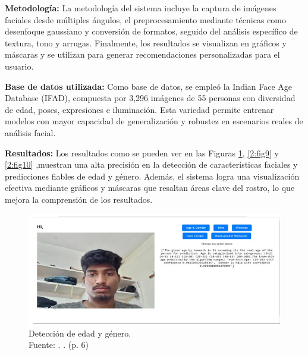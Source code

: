 \textbf{Metodología:}
La metodología del sistema incluye la captura de imágenes faciales desde múltiples ángulos, el preprocesamiento mediante técnicas como desenfoque gaussiano y conversión de formatos, seguido del análisis específico de textura, tono y arrugas. Finalmente, los resultados se visualizan en gráficos y máscaras y se utilizan para generar recomendaciones personalizadas para el usuario.  

\textbf{Base de datos utilizada:}
Como base de datos, se empleó la Indian Face Age Database (IFAD), compuesta por 3,296 imágenes de 55 personas con diversidad de edad, poses, expresiones e iluminación. Esta variedad permite entrenar modelos con mayor capacidad de generalización y robustez en escenarios reales de análisis facial.  

\textbf{Resultados:}
Los resultados como se pueden ver en las Figuras \ref{2:fig8}, \ref{2:fig9} y \ref{2:fig10} ,muestran una alta precisión en la detección de características faciales y predicciones fiables de edad y género. Además, el sistema logra una visualización efectiva mediante gráficos y máscaras que resaltan áreas clave del rostro, lo que mejora la comprensión de los resultados.  

\begin{figure}[!ht]
	\begin{center}
		\includegraphics[width=1\textwidth]{2/figures/softres1.png}
		\caption[Detección de edad y género]{Detección de edad y género.\\
			Fuente: \cite{Tamilkodi2024}. . (p. 6)}
		\label{2:fig8}
	\end{center}
\end{figure}

